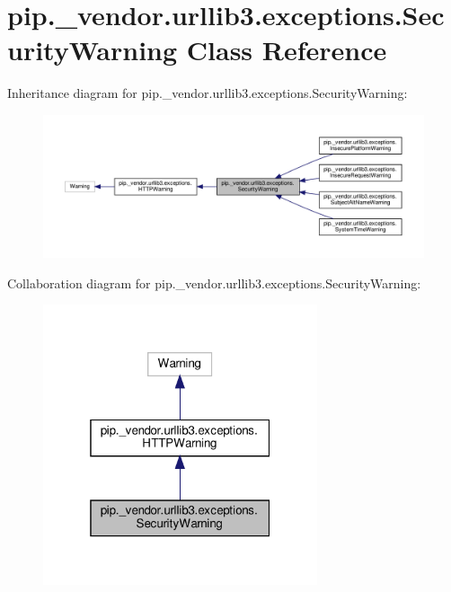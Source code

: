 \hypertarget{classpip_1_1__vendor_1_1urllib3_1_1exceptions_1_1SecurityWarning}{}\section{pip.\+\_\+vendor.\+urllib3.\+exceptions.\+Security\+Warning Class Reference}
\label{classpip_1_1__vendor_1_1urllib3_1_1exceptions_1_1SecurityWarning}


Inheritance diagram for pip.\+\_\+vendor.\+urllib3.\+exceptions.\+Security\+Warning\+:
\nopagebreak
\begin{figure}[H]
\begin{center}
\leavevmode
\includegraphics[width=350pt]{classpip_1_1__vendor_1_1urllib3_1_1exceptions_1_1SecurityWarning__inherit__graph}
\end{center}
\end{figure}


Collaboration diagram for pip.\+\_\+vendor.\+urllib3.\+exceptions.\+Security\+Warning\+:
\nopagebreak
\begin{figure}[H]
\begin{center}
\leavevmode
\includegraphics[width=229pt]{classpip_1_1__vendor_1_1urllib3_1_1exceptions_1_1SecurityWarning__coll__graph}
\end{center}
\end{figure}


